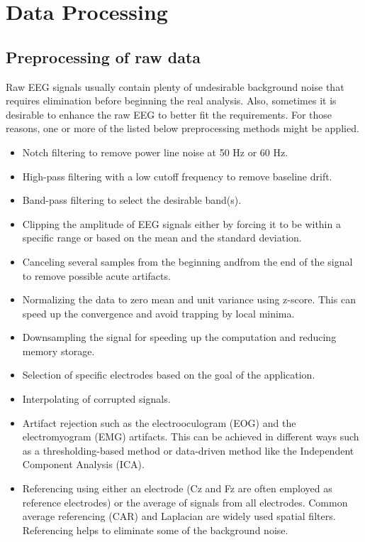 \documentclass[journal,twocolumn]{IEEEtran}
\begin{document}
\section{Data Processing}
\subsection{Preprocessing of raw data}
Raw EEG signals usually contain plenty of undesirable background noise that requires elimination before beginning the real analysis. Also, sometimes it is desirable to enhance the raw EEG to better fit the requirements. For those reasons, one or more of the listed below preprocessing methods \cite{tayeb2019validating, tang2020motor, ludwig2017investigation, reddy2019electroencephalogram} might be applied.

\begin{itemize}
  \item Notch filtering to remove power line noise at 50 Hz or 60 Hz.
  \item High-pass filtering with a low cutoff frequency to remove baseline drift.
  \item Band-pass filtering to select the desirable band(s).
  \item Clipping the amplitude of EEG signals either by forcing it to be within a specific range or based on the mean and the standard deviation.
  \item Canceling several samples from the beginning and\or from the end of the signal to remove possible acute artifacts.
  \item Normalizing the data to zero mean and unit variance using z-score. This can speed up the convergence and avoid trapping by local minima.
  \item Downsampling the signal for speeding up the computation and reducing memory storage.
  \item Selection of specific electrodes based on the goal of the application.
  \item Interpolating of corrupted signals.
  \item Artifact rejection such as the electrooculogram (EOG) and the electromyogram (EMG) artifacts. This can be achieved in different ways such as a thresholding-based method or data-driven method like the Independent Component Analysis (ICA).
  \item Referencing using either an electrode (Cz and Fz are often employed as reference electrodes) or the average of signals from all electrodes. Common average referencing (CAR) and Laplacian are widely used spatial filters. Referencing helps to eliminate some of the background noise.
\end{itemize}
\end{document}
